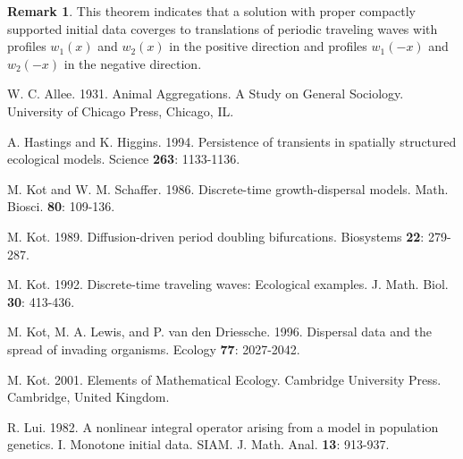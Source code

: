 \documentclass[11pt]{article}
\numberwithin{equation}{section}
\theoremstyle{definition}
\newtheorem{remark}[theorem]{Remark}
\begin{document}
\begin{remark}
This theorem indicates that a solution with proper compactly supported initial data coverges to translations of periodic traveling waves with profiles $w_1(x)$ and $w_2(x)$ in the positive direction and profiles $w_1(-x)$ and $w_2(-x)$ in the negative direction.
\end{remark}



\begin{thebibliography}{9}
  W. C. Allee. 1931. Animal Aggregations. A Study on
General Sociology. University of Chicago Press, Chicago, IL.



 A. Hastings and K. Higgins. 1994. Persistence of transients in spatially
structured ecological models. Science {\bf 263}: 1133-1136.



 M. Kot and W. M. Schaffer. 1986.  Discrete-time growth-dispersal models.
Math. Biosci. {\bf 80}: 109-136.


 M. Kot. 1989. Diffusion-driven period doubling bifurcations.
Biosystems {\bf 22}: 279-287.


 M. Kot. 1992. Discrete-time traveling waves:
Ecological examples. J. Math. Biol. {\bf 30}: 413-436.


 M. Kot, M. A. Lewis, and P. van den Driessche. 1996. Dispersal data and the spread of invading
organisms. Ecology {\bf 77}: 2027-2042.






 M. Kot. 2001. Elements of Mathematical Ecology.
Cambridge University Press. Cambridge, United Kingdom.

 R. Lui. 1982. A nonlinear integral operator arising from a model in population
genetics. I. Monotone initial data. SIAM. J. Math. Anal. {\bf 13}:
913-937.


\end{thebibliography}
\end{document}
